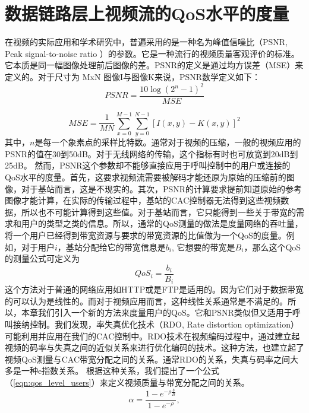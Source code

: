 \section{数据链路层上视频流的QoS水平的度量}
在视频的实际应用和学术研究中，普遍采用的是一种名为峰值信噪比（PSNR, Peak signal-to-noise ratio ）的参数。它是一种流行的视频质量客观评价的标准。它本质是同一幅图像处理前后图像的差。PSNR的定义是通过均方误差（MSE）来定义的。对于尺寸为 MxN 图像I与图像K来说，PSNR数学定义如下：
\begin{equation}
PSNR = \frac{10 \log (2^n -1)^2 }{ MSE }
\end{equation}

\begin{equation}
MSE = \frac{1}{MN} \sum^{M-1}_{x=0} \sum^{N-1}_{y=0} \left[ I(x,y) - K(x,y) \right] ^2
\end{equation}
其中，$n$是每一个象素点的采样比特数。通常对于视频的压缩，一般的视频应用的PSNR的值在30到50dB。对于无线网络的传输，这个指标有时也可放宽到20dB到25dB。
然而，PSNR这个参数却不能够直接应用于呼叫控制中的用户或连接的QoS水平的度量。首先，这要求视频流需要被解码才能还原为原始的压缩前的图像，对于基站而言，这是不现实的。其次，PSNR的计算要求提前知道原始的参考图像才能计算，在实际的传输过程中，基站的CAC控制器无法得到这些视频数据，所以也不可能计算得到这些值。对于基站而言，它只能得到一些关于带宽的需求和用户的类型之类的信息。所以，通常的QoS测量的做法是度量网络的吞吐量，将一个用户已经得到带宽资源与要求的带宽资源的比值做为一个QoS的度量。例如，对于用户$i$，基站分配给它的带宽信息是$b_i$, 它想要的带宽是$B_i$，那么这个QoS的测量公式可定义为
\begin{equation}
QoS_i = \frac{b_i}{B_i}
\end{equation}
这个方法对于普通的网络应用如HTTP或是FTP是适用的。因为它们对于数据带宽的可以认为是线性的。而对于视频应用而言，这种线性关系通常是不满足的。所以，本章我们引入一个新的方法来度量用户的QoS。它和PSNR类似但又适用于呼叫接纳控制。我们发现，率失真优化技术（RDO, Rate distortion optimization）可能利用并应用在我们的CAC控制中。RDO技术在视频编码过程中，通过建立起视频的码率与失真之间的近似关系来进行优化编码的技术。这种方法，也建立起了视频QoS测量与CAC带宽分配之间的关系。通常RDO的关系，失真与码率之间大多是一种e指数关系。\cite{E-H-Yang.TIP.2007} \cite{J-Y-Liu.ICIP.2009} \cite{He1013856} 根据这种关系，我们提出了一个公式（\ref{eqn:qos_level_users}）来定义视频质量与带宽分配之间的关系。
\begin{equation}
\alpha = \frac{1- e^{-\rho \frac{b}{B} }}{1-e^{-\rho}},
\label{eqn:qos_level_users}
\end{equation}
